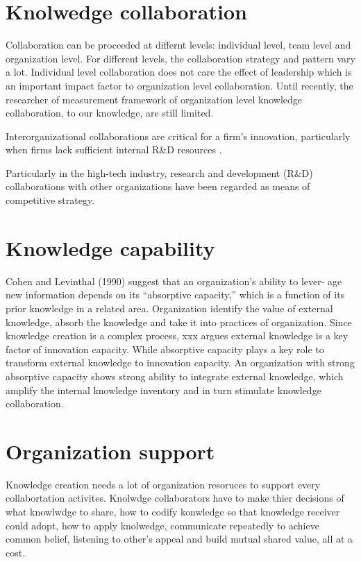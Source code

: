 \documentclass{elsarticle}
\begin{document}
\section{Knolwedge collaboration}
\label{sec:knolw-coll}

Collaboration can be proceeded at differnt levels: individual level,
team level and organization level. For different levels, the
collaboration strategy
and  pattern vary a lot. Individual level collaboration does not care
the effect of leadership which is an important impact factor to
organization level collaboration. Until recently, the researcher of 
measurement framework of organization level knowledge collaboration,
to our knowledge, are still limited.     

Interorganizational
collaborations are critical for a firm’s innovation, particularly when firms
lack sufficient internal R\&D resources \cite{lin2003technology}.

Particularly in the high-tech
industry, research and development (R\&D) collaborations with other organizations have
been regarded as means of competitive strategy.
\section{Knowledge capability}
\label{sec:knowledge-capability}


Cohen and Levinthal
(1990) suggest that an organization’s ability to lever-
age new information depends on its “absorptive
capacity,” which is a function of its prior knowledge
in a related area. Organization identify the value of external
knowledge, absorb the knowledge and take it into practices of
organization. Since knowledge creation is a complex process, xxx
argues external knowledge is a key factor of innovation
capacity. While absorptive capacity plays a key role to transform external knowledge
to innovation capacity. An
organization with strong absorptive capacity shows strong ability to
integrate external knowledge, which amplify the internal knowledge
inventory and in turn stimulate knowledge collaboration.   

\section{Organization support}
\label{sec:organization-support}

Knowledge creation needs a lot of organization resoruces to support
every collabortation activites. Knolwdge collaborators have to make
thier decisions of 
what knowlwdge to share, how to codify konwledge so that knowledge
receiver could adopt, how to apply knolwedge, communicate repeatedly to
achieve common belief, listening to  other's appeal  and build mutual
shared value, all at a cost.   


\end{document}
